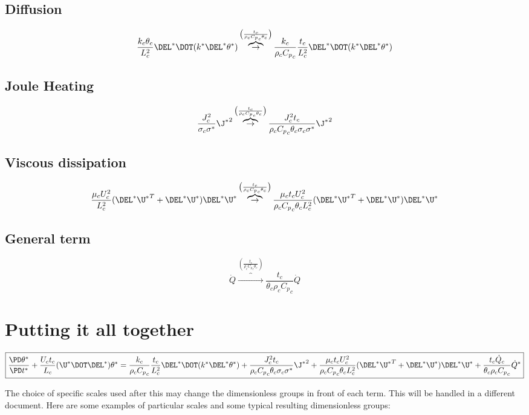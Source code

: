 \documentclass[11pt]{article}
\newcommand{\OB}{\overbrace{\rightarrow}^{\left(\frac{t_c}{\rho_c {C_p}_c \theta_c}\right)}}
\newcommand{\Cp}{{C_p}_c}
\begin{document}
\subsection{Diffusion}
\begin{equation}
	\frac{k_c \theta_c}{L_c^2} \DEL^* \DOT (k^* \DEL^* \theta^*)
	\OB
	\frac{k_c}{\rho_c \Cp} \frac{t_c}{L_c^2} \DEL^* \DOT (k^* \DEL^* \theta^*)
\end{equation}
\subsection{Joule Heating}
\begin{equation}
	\frac{J_c^2}{\sigma_c \sigma^*} {\J^*}^2
	\OB
	\frac{J_c^2 t_c}{\rho_c \Cp \theta_c \sigma_c \sigma^*} {\J^*}^2
\end{equation}
\subsection{Viscous dissipation}
\begin{equation}
	\frac{\mu_c U_c^2}{L_c^2} ( \DEL^* {\U^*}^T + \DEL^* \U^* ) \DEL^* \U^*
	\OB
	\frac{\mu_c t_c U_c^2}{\rho_c \Cp \theta_c L_c^2} ( \DEL^* {\U^*}^T + \DEL^* \U^* ) \DEL^* \U^*
\end{equation}
\subsection{General term}
\begin{equation}
	\dot{Q}
	\OB
	\frac{t_c}{\theta_c \rho_c \Cp}\dot{Q}
\end{equation}
\section{Putting it all together}
\begin{equation}
	\boxed{
	\frac{\PD \theta^*}{\PD t^*}
	+ \frac{U_c t_c}{L_c} (\U^* \DOT \DEL^*) \theta^*
	= \frac{k_c}{\rho_c \Cp} \frac{t_c}{L_c^2} \DEL^* \DOT (k^* \DEL^* \theta^*)
	+ \frac{J_c^2 t_c}{\rho_c \Cp \theta_c \sigma_c \sigma^*} {\J^*}^2
	+ \frac{\mu_c t_c U_c^2}{\rho_c \Cp \theta_c L_c^2} ( \DEL^* {\U^*}^T + \DEL^* \U^* ) \DEL^* \U^*
	+ \frac{t_c \dot{Q}_c}{\theta_c \rho_c \Cp} \dot{Q}^*
	}
\end{equation}

The choice of specific scales used after this may change the dimensionless groups in front of each term. This will be handled in a different document. Here are some examples of particular scales and some typical resulting dimensionless groups:
\end{document}
